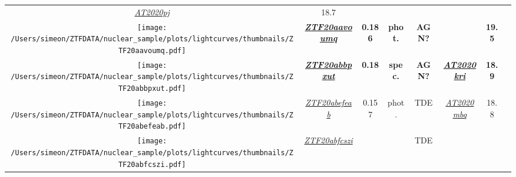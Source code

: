 \begin{table*}
{\begin{tabular}{c c  c  c  c   c  c  c}
      \textit{\href{https://www.wis-tns.org/object/2020pj}{AT2020pj}}                                                                             & 18.7                                                                                              &                                                                                                            \\
      \parbox[c]{12em}{\texttt{[image: /Users/simeon/ZTFDATA/nuclear\_sample/plots/lightcurves/thumbnails/ZTF20aavoumq.pdf]}} & \textbf{\textit{\href{https://ztfnuclear.simeonreusch.com/transient/ZTF20aavoumq}{ZTF20aavoumq}}} & \textbf{0.186} & \textbf{phot.}          &
      \textbf{AGN?}                                                                                                                               & ~                                                                                                 & \textbf{19.5}  &                                                                                           \\
      \parbox[c]{12em}{\texttt{[image: /Users/simeon/ZTFDATA/nuclear\_sample/plots/lightcurves/thumbnails/ZTF20abbpxut.pdf]}} & \textbf{\textit{\href{https://ztfnuclear.simeonreusch.com/transient/ZTF20abbpxut}{ZTF20abbpxut}}} & \textbf{0.18}  & \textbf{spec.}          & \textbf{AGN?}     &
      \textbf{\textit{\href{https://www.wis-tns.org/object/2020kri}{AT2020kri}}}                                                                  & \textbf{18.9}                                                                                     &                                                                                                            \\
      \parbox[c]{12em}{\texttt{[image: /Users/simeon/ZTFDATA/nuclear\_sample/plots/lightcurves/thumbnails/ZTF20abefeab.pdf]}} & \textit{\href{https://ztfnuclear.simeonreusch.com/transient/ZTF20abefeab}{ZTF20abefeab}}          & 0.157          & phot.                   & TDE               &
      \textit{\href{https://www.wis-tns.org/object/2020mbq}{AT2020mbq}}                                                                           & 18.8                                                                                              &                                                                                                            \\
      \parbox[c]{12em}{\texttt{[image: /Users/simeon/ZTFDATA/nuclear\_sample/plots/lightcurves/thumbnails/ZTF20abfcszi.pdf]}} & \textit{\href{https://ztfnuclear.simeonreusch.com/transient/ZTF20abfcszi}{ZTF20abfcszi}}          & ~              & ~                       & TDE               &

\end{tabular}}
\end{table*}
